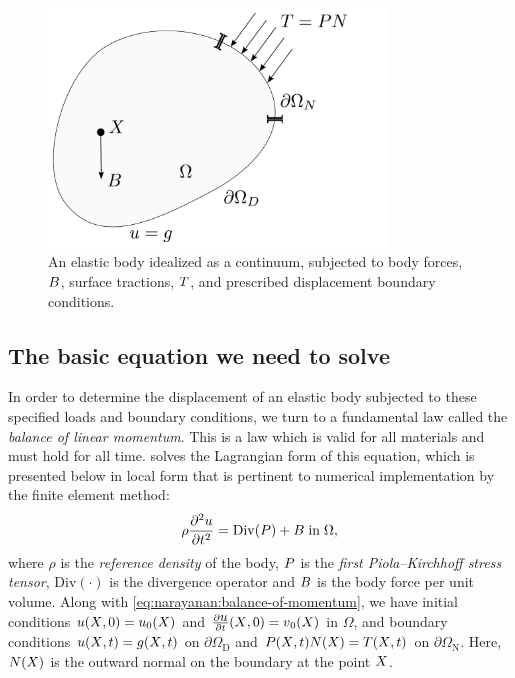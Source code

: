 \begin{figure}
    \center\includegraphics[width=0.8\textwidth]{chapters/narayanan/images/pdf/continuumpotato}
  \caption{An elastic body idealized as a continuum, subjected to body
    forces, $\mbox{$ B$}$, surface tractions, $\mbox{$ T$}$, and prescribed
    displacement boundary conditions.}
    \label{fig:narayanan:continuumpotato}
\end{figure}

\subsection{The basic equation we need to solve}

In order to determine the displacement of an elastic body subjected to
these specified loads and boundary conditions, we turn to a
fundamental law called the {\em balance of linear momentum}. This is a
law which is valid for all materials and must hold for all
time. \twist{} solves the Lagrangian form of this equation, which is
presented below in local form that is pertinent to numerical
implementation by the finite element method:
\begin{equation}
  \rho \frac{\partial^{2} \mbox{$ u$}}{\partial t^{2}} = \mathrm{Div}(\mbox{$ P$})
  + \mbox{$ B$}\; \mathrm{in}\; \Omega,
  \label{eq:narayanan:balance-of-momentum}
\end{equation}
where $\rho$ is the {\em reference density} of the body, $\mbox{$ P$}$ is the
{\em first Piola--Kirchhoff stress tensor}, $\mathrm{Div} (\cdot)$ is
the divergence operator and $\mbox{$ B$}$ is the body force per unit
volume. Along with \eqref{eq:narayanan:balance-of-momentum}, we have
initial conditions $\mbox{$ u$}(\mbox{$ X$}, 0) = \mbox{$ u$}_{0}(\mbox{$ X$})$ and
$\frac{\partial\mbox{$ u$}}{\partial t}(\mbox{$ X$}, 0) = \mbox{$ v$}_{0}(\mbox{$ X$})$ in $\Omega$,
and boundary conditions $\mbox{$ u$}(\mbox{$ X$}, t) = \mbox{$ g$}(\mbox{$ X$}, t)$ on
$\partial\Omega_{\mathrm{D}}$ and $\mbox{$ P$}(\mbox{$ X$}, t) \mbox{$ N$}(\mbox{$ X$}) = \mbox{$ T$}(\mbox{$ X$}, t)$
on $\partial\Omega_{\mathrm{N}}$. Here, $\mbox{$ N$}(X)$ is the outward normal
on the boundary at the point $\mbox{$ X$}$.

